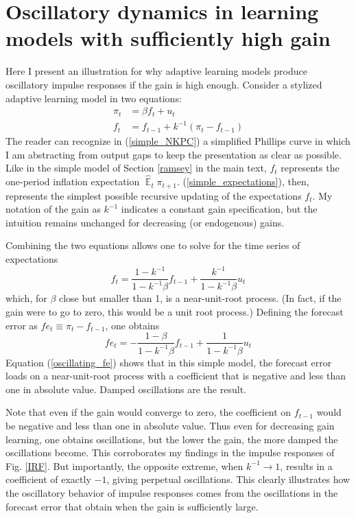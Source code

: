 \documentclass[11pt]{article}
\renewcommand{\[}{\begin{equation}}
\renewcommand{\]}{\end{equation}}
\DeclareMathOperator{\E}{\mathbb{E}}
\begin{document}
\section{Oscillatory dynamics in learning models with sufficiently high gain} \label{app_oscillations}
Here I present an illustration for why adaptive learning models produce oscillatory impulse responses if the gain is high enough. Consider a stylized adaptive learning model in two equations:
\begin{align}
\pi_t & = \beta f_t + u_t \label{simple_NKPC} \\
f_t & = f_{t-1} + k^{-1}(\pi_t - f_{t-1}) \label{simple_expectations}
\end{align}
The reader can recognize in (\ref{simple_NKPC}) a simplified Phillips curve in which I am abstracting from output gaps to keep the presentation as clear as possible. Like in the simple model of Section \ref{ramsey} in the main text, $f_t$ represents the one-period inflation expectation $\hat{\E}_t \pi_{t+1}$. (\ref{simple_expectations}), then, represents the simplest possible recursive updating of the expectations $f_t$. My notation of the gain as $k^{-1}$ indicates a constant gain specification, but the intuition remains unchanged for decreasing (or endogenous) gains. 

Combining the two equations allows one to solve for the time series of expectations
\begin{equation}
f_t = \frac{1-k^{-1}}{1-k^{-1}\beta}f_{t-1} + \frac{k^{-1}}{1-k^{-1}\beta}u_t
\end{equation}
which, for $\beta$ close but smaller than 1, is a near-unit-root process. (In fact, if the gain were to go to zero, this would be a unit root process.) Defining the forecast error as $fe_t \equiv \pi_t - f_{t-1}$, one obtains
\begin{equation}
fe_t = -\frac{1-\beta}{1-k^{-1}\beta}f_{t-1} + \frac{1}{1-k^{-1}\beta}u_t \label{oscillating_fe}
\end{equation}
Equation (\ref{oscillating_fe}) shows that in this simple model, the forecast error loads on a near-unit-root process with a coefficient that is negative and less than one in absolute value. Damped oscillations are the result. 

Note that even if the gain would converge to zero, the coefficient on $f_{t-1}$ would be negative and less than one in absolute value. Thus even for decreasing gain learning, one obtains oscillations, but the lower the gain, the more damped the oscillations become. This corroborates my findings in the impulse responses of Fig. \ref{IRF}. But importantly, the opposite extreme, when $k^{-1}\rightarrow 1$, results in a coefficient of exactly $-1$, giving perpetual oscillations. This clearly illustrates how the oscillatory behavior of impulse responses comes from the oscillations in the forecast error that obtain when the gain is sufficiently large. 
\end{document}
